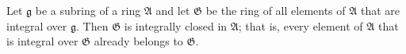 Let $\mathfrak{g}$ be a subring of a ring $\mathfrak{A}$ and let $\mathfrak{G}$ be the ring of all elements of $\mathfrak{A}$ that are integral over $\mathfrak{g}$. Then $\mathfrak{G}$ is integrally closed in $\mathfrak{A}$; that is, every element of $\mathfrak{A}$ that is integral over $\mathfrak{G}$ already belongs to $\mathfrak{G}$.

